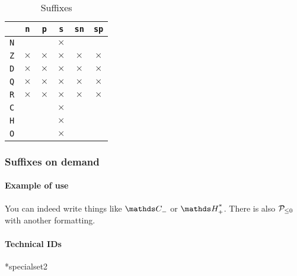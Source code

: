 \documentclass[12pt,a4paper]{article}
\makeatletter
\theoremstyle{definition}
\newcommand\IDmacro{\@ifstar{\@IDmacro@star}{\@IDmacro@no@star}}
\newcommand\@IDmacro@no@star[3]{%
        \texttt{%
        	\textbackslash#1%
        	\IfStrEq{#2}{0}{}{%
        		\,\,[#2 Option%
				\IfStrEq{#2}{1}{}{s}]%
			}%
    	    \IfStrEq{#3}{}{}{%
	    		\,\,(#3 Argument%
				\IfStrEq{#3}{1}{}{s})%
			}
	   	}
        \immediate\write\tempfile{macro,#1,#2,#3}%
    }
\newcommand\@IDmacro@star[2]{%
        \@IDmacro@no@star{#1}{0}{#2}%
    }
\makeatother
\begin{document}
\newcommand\xx{\phantom{$\times$}}
\begin{table}[h]
    \caption{Suffixes}
    \begin{center}
        \begin{tabular}{c|c|c|c|c|c}
  & \verb+n+ & \verb+p+ & \verb+s+ & \verb+sn+ & \verb+sp+ \\
\hline \verb+N+ & \xx & \xx & $\times$ & \xx & \xx \\
\hline \verb+Z+ & $\times$ & $\times$ & $\times$ & $\times$ & $\times$ \\
\hline \verb+D+ & $\times$ & $\times$ & $\times$ & $\times$ & $\times$ \\
\hline \verb+Q+ & $\times$ & $\times$ & $\times$ & $\times$ & $\times$ \\
\hline \verb+R+ & $\times$ & $\times$ & $\times$ & $\times$ & $\times$ \\
\hline \verb+C+ & \xx & \xx & $\times$ & \xx & \xx \\
\hline \verb+H+ & \xx & \xx & $\times$ & \xx & \xx \\
\hline \verb+O+ & \xx & \xx & $\times$ & \xx & \xx \\
        \end{tabular}
    \end{center}
    \label{table:suffixes-sets}
\end{table}



        \subsubsection{Suffixes on demand}

            \paragraph{Example of use}

\begin{tcblisting}{}
You can indeed write things like $\specialset{\CC}{n}$ or $\specialset{\HH}{sp}$.
There is also $\specialset*{\probaset{P}}{n}$ with another formatting.
\end{tcblisting}


            \paragraph{Technical IDs}

\IDmacro*{specialset}{2}
\end{document}
